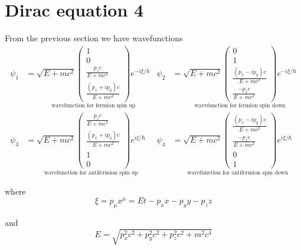 

\section*{Dirac equation 4}

From the previous section we have wavefunctions
\begin{align*}
\psi_1&=\underset{\text{wavefunction for fermion spin up}}
{
\sqrt{E+mc^2}
\begin{pmatrix}1\\0\\\frac{p_zc}{E+mc^2}\\\frac{(p_x+ip_y)c}{E+mc^2}\end{pmatrix}
e^{-i\xi/\hbar}
}
&
\psi_2&=\underset{\text{wavefunction for fermion spin down}}
{
\sqrt{E+mc^2}
\begin{pmatrix}0\\1\\\frac{(p_x-ip_y)c}{E+mc^2}\\\frac{-p_zc}{E+mc^2}\end{pmatrix}
e^{-i\xi/\hbar}
}
\\[1ex]
\psi_3&=\underset{\text{wavefunction for antifermion spin up}}
{
\sqrt{E+mc^2}
\begin{pmatrix}\frac{p_zc}{E+mc^2}\\\frac{(p_x+ip_y)c}{E+mc^2}\\1\\0\end{pmatrix}
e^{i\xi/\hbar}
}
&
\psi_4&=\underset{\text{wavefunction for antifermion spin down}}
{
\sqrt{E+mc^2}
\begin{pmatrix}\frac{(p_x-ip_y)c}{E+mc^2}\\\frac{-p_zc}{E+mc^2}\\0\\1\end{pmatrix}
e^{i\xi/\hbar}
}
\end{align*}

where
\begin{equation*}
\xi=p_\mu x^\mu=Et-p_xx-p_yy-p_zz
\end{equation*}

and
\begin{equation*}
E=\sqrt{p_x^2c^2+p_y^2c^2+p_z^2c^2+m^2c^4}
\end{equation*}

